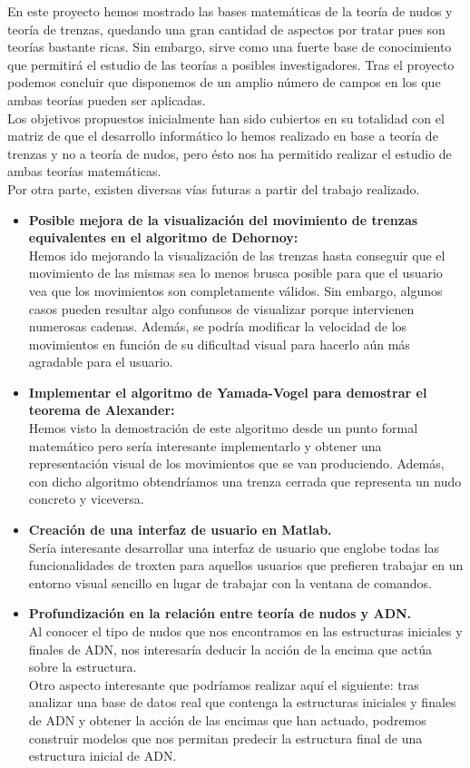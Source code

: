 
En este proyecto hemos mostrado las bases matemáticas de la teoría de nudos y teoría de trenzas, quedando una gran cantidad de aspectos por tratar pues son teorías bastante ricas. Sin embargo, sirve como una fuerte base de conocimiento que permitirá el estudio de las teorías a posibles investigadores. Tras el proyecto podemos concluir que disponemos de un amplio número de campos en los que ambas teorías pueden ser aplicadas. \\

Los objetivos propuestos inicialmente han sido cubiertos en su totalidad con el matriz de que el desarrollo informático lo hemos realizado en base a teoría de trenzas y no a teoría de nudos, pero ésto nos ha permitido realizar el estudio de ambas teorías matemáticas.\\

\bigskip
Por otra parte, existen diversas vías futuras a partir del trabajo realizado. 
\begin{itemize}
	\item\textbf{Posible mejora de la visualización del movimiento de trenzas equivalentes en el algoritmo de Dehornoy:}\\
	Hemos ido mejorando la visualización de las trenzas hasta conseguir que el movimiento de las mismas sea lo menos brusca posible para que el usuario vea que los movimientos son completamente válidos. Sin embargo, algunos casos pueden resultar algo confunsos de visualizar porque intervienen numerosas cadenas. Además, se podría modificar la velocidad de los movimientos en función de su dificultad visual para hacerlo aún más agradable para el usuario. 
	\item \textbf{Implementar el algoritmo de Yamada-Vogel para demostrar el teorema de Alexander:}\\
	Hemos visto la demostración de este algoritmo desde un punto formal matemático pero sería interesante implementarlo y obtener una representación visual de los movimientos que se van produciendo. Además, con dicho algoritmo obtendríamos una trenza cerrada que representa un nudo concreto y viceversa. 
	\item \textbf{Creación de una interfaz de usuario en Matlab. }\\
	Sería interesante desarrollar una interfaz de usuario que englobe todas las funcionalidades de troxten para aquellos usuarios que prefieren trabajar en un entorno visual sencillo en lugar de trabajar con la ventana de comandos. 
	\newpage
	\item\textbf{Profundización en la relación entre teoría de nudos y ADN. }\\
	Al conocer el tipo de nudos que nos encontramos en las estructuras iniciales y finales de ADN, nos interesaría deducir la acción de la encima que actúa sobre la estructura. \\
	Otro aspecto interesante que podríamos realizar aquí el siguiente: tras analizar una base de datos real que contenga la estructuras iniciales y finales de ADN y obtener la acción de las encimas que han actuado, podremos construir modelos que nos permitan predecir la estructura final de una estructura inicial de ADN.
\end{itemize}